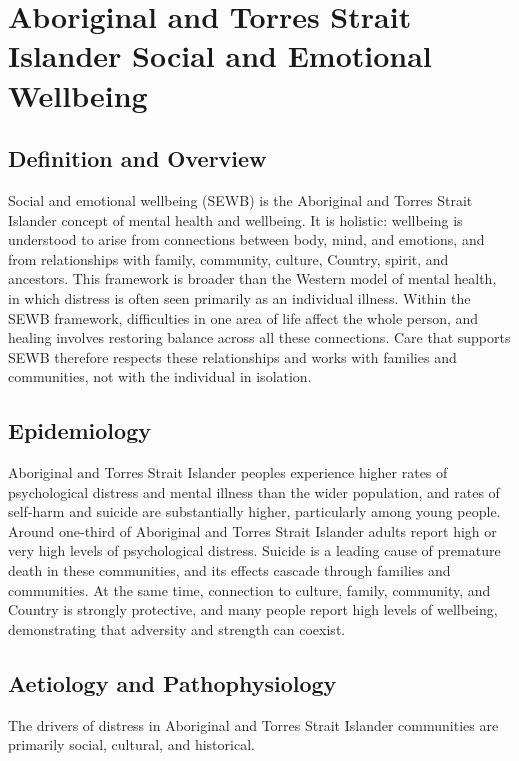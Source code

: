 \chapter{Aboriginal and Torres Strait Islander Social and Emotional Wellbeing}

\section*{Definition and Overview}
Social and emotional wellbeing (SEWB) is the Aboriginal and Torres Strait Islander concept of mental health and wellbeing. It is holistic: wellbeing is understood to arise from connections between body, mind, and emotions, and from relationships with family, community, culture, Country, spirit, and ancestors. This framework is broader than the Western model of mental health, in which distress is often seen primarily as an individual illness. Within the SEWB framework, difficulties in one area of life affect the whole person, and healing involves restoring balance across all these connections. Care that supports SEWB therefore respects these relationships and works with families and communities, not with the individual in isolation.

\section*{Epidemiology}
Aboriginal and Torres Strait Islander peoples experience higher rates of psychological distress and mental illness than the wider population, and rates of self-harm and suicide are substantially higher, particularly among young people. Around one-third of Aboriginal and Torres Strait Islander adults report high or very high levels of psychological distress. Suicide is a leading cause of premature death in these communities, and its effects cascade through families and communities. At the same time, connection to culture, family, community, and Country is strongly protective, and many people report high levels of wellbeing, demonstrating that adversity and strength can coexist.

\section*{Aetiology and Pathophysiology}
The drivers of distress in Aboriginal and Torres Strait Islander communities are primarily social, cultural, and historical.

